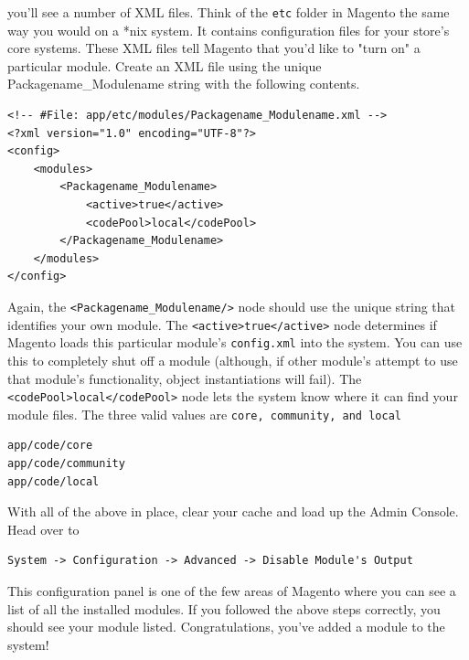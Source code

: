 \documentclass[oneside]{book}
\begin{document}
you'll see a number of XML files.  Think of the \footnotesize\texttt{etc} \normalsize  folder in Magento the same way you would on a *nix system.  It contains configuration files for your store's core systems.  These XML files tell Magento that you'd like to "turn on" a particular module.  Create an XML file using the unique Packagename\_Modulename string with the following contents.

\begin{lstlisting}
<!-- #File: app/etc/modules/Packagename_Modulename.xml -->
<?xml version="1.0" encoding="UTF-8"?>
<config>
    <modules>
        <Packagename_Modulename>
            <active>true</active>
            <codePool>local</codePool>
        </Packagename_Modulename>
    </modules>
</config>

\end{lstlisting}


Again, the \footnotesize\texttt{\textless Packagename\_Modulename/\textgreater } \normalsize  node should use the unique string that identifies your own module.  The \footnotesize\texttt{\textless active\textgreater true\textless /active\textgreater } \normalsize  node determines if Magento loads this particular module's \footnotesize\texttt{config.xml} \normalsize  into the system.  You can use this to completely shut off a module (although, if other module's attempt to use that module's functionality, object instantiations will fail).  The \footnotesize\texttt{\textless codePool\textgreater local\textless /codePool\textgreater } \normalsize  node lets the system know where it can find your module files.  The three valid values are \footnotesize\texttt{core, community, and local} \normalsize 

\begin{lstlisting}
app/code/core
app/code/community
app/code/local

\end{lstlisting}


With all of the above in place, clear your cache and load up the Admin Console.  Head over to 

\begin{lstlisting}
System -> Configuration -> Advanced -> Disable Module's Output

\end{lstlisting}


This configuration panel is one of the few areas of Magento where you can see a list of all the installed modules.  If you followed the above steps correctly, you should see your module listed.  Congratulations, you've added a module to the system!
\end{document}
